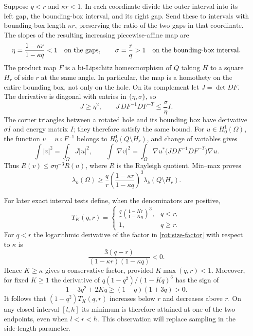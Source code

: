 \documentclass[11pt,reqno]{amsart}
\numberwithin{equation}{section}
\begin{document}
Suppose $q<r$ and $\kappa r<1$. In each coordinate divide the outer
interval into its left gap, the bounding-box interval, and its right
gap. Send these to intervals with bounding-box length $\kappa r$,
preserving the ratio of the two gaps in that coordinate. The slopes
of the resulting increasing piecewise-affine map are
\[
 \eta=\frac{1-\kappa r}{1-\kappa q}<1
 \quad\hbox{on the gaps},\qquad
 \sigma=\frac rq>1\quad\hbox{on the bounding-box interval}.
\]
The product map $F$ is a bi-Lipschitz homeomorphism of $Q$ taking $H$
to a square $H_r$ of side $r$ at the same angle. In particular, the
map is a homothety on the entire bounding box, not only on the hole.
On its complement let $J=\det DF$. The derivative is diagonal with
entries in $\{\eta,\sigma\}$, so
\[
 J\geq\eta^2,\qquad
 J\,DF^{-1}DF^{-T}\leq\frac{\sigma}{\eta}I.
\]
The corner triangles between a rotated hole and its bounding box have
derivative $\sigma I$ and energy matrix $I$; they therefore satisfy the
same bound. For $u\in H^1_0(\Omega)$, the function $v=u\circ F^{-1}$
belongs to $H^1_0(Q\setminus H_r)$, and change of variables gives
\[
 \int|v|^2=\int_\Omega J|u|^2,\qquad
 \int|\nabla v|^2=
 \int_\Omega \nabla u^{*}\bigl(JDF^{-1}DF^{-T}\bigr)\nabla u.
\]
Thus $R(v)\leq\sigma\eta^{-3}R(u)$, where $R$ is the Rayleigh
quotient. Min--max proves
\begin{equation}\label{rot:size-factor}
 \lambda_k(\Omega)\geq
 \frac qr\left(\frac{1-\kappa r}{1-\kappa q}\right)^3
 \lambda_k(Q\setminus H_r).
\end{equation}

For later exact interval tests define, when the denominators are
positive,
\begin{equation}\label{rot:T-definition}
 T_K(q,r)=
 \begin{cases}
  \displaystyle\frac qr\left(\frac{1-Kr}{1-Kq}\right)^3,&q<r,\\[4pt]
  1,&q\geq r.
 \end{cases}
\end{equation}
For $q<r$ the logarithmic derivative of the factor in
\eqref{rot:size-factor} with respect to $\kappa$ is
\[
 \frac{3(q-r)}{(1-\kappa r)(1-\kappa q)}<0.
\]
Hence $K\geq\kappa$ gives a conservative factor, provided
$K\max(q,r)<1$. Moreover, for fixed $K\geq1$ the derivative of
$q(1-q^2)/(1-Kq)^3$ has the sign of
\[
 1-3q^2+2Kq\geq(1-q)(1+3q)>0.
\]
It follows that $(1-q^2)T_K(q,r)$ increases below $r$ and decreases
above $r$. On any closed interval $[l,h]$ its minimum is therefore
attained at one of the two endpoints, even when $l<r<h$. This observation
will replace sampling in the side-length parameter.
\end{document}

